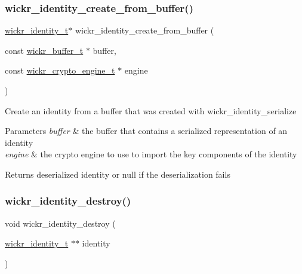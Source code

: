 \subsubsection{\texorpdfstring{wickr\+\_\+identity\+\_\+create\+\_\+from\+\_\+buffer()}{wickr\_identity\_create\_from\_buffer()}}
{\footnotesize\ttfamily \hyperlink{structwickr__identity}{wickr\+\_\+identity\+\_\+t}$\ast$ wickr\+\_\+identity\+\_\+create\+\_\+from\+\_\+buffer (\begin{DoxyParamCaption}\item[{const \hyperlink{structwickr__buffer}{wickr\+\_\+buffer\+\_\+t} $\ast$}]{buffer,  }\item[{const \hyperlink{structwickr__crypto__engine}{wickr\+\_\+crypto\+\_\+engine\+\_\+t} $\ast$}]{engine }\end{DoxyParamCaption})}

Create an identity from a buffer that was created with \textquotesingle{}wickr\+\_\+identity\+\_\+serialize\textquotesingle{}


\begin{DoxyParams}{Parameters}
{\em buffer} & the buffer that contains a serialized representation of an identity \\
\hline
{\em engine} & the crypto engine to use to import the key components of the identity \\
\hline
\end{DoxyParams}
\begin{DoxyReturn}{Returns}
deserialized identity or null if the deserialization fails 
\end{DoxyReturn}
\mbox{\label{group__wickr__identity_ga9e4a0f3736d52836c9a9fc61794c8ddd}} 
\subsubsection{\texorpdfstring{wickr\+\_\+identity\+\_\+destroy()}{wickr\_identity\_destroy()}}
{\footnotesize\ttfamily void wickr\+\_\+identity\+\_\+destroy (\begin{DoxyParamCaption}\item[{\hyperlink{structwickr__identity}{wickr\+\_\+identity\+\_\+t} $\ast$$\ast$}]{identity }\end{DoxyParamCaption})}

